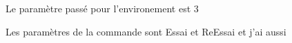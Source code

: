 \documentclass[a4paper,12pt]{book}
\begin{document}
\newenvironment{EssUn}[1]{
	\newcommand{\Commande}[2]{Les paramètres de la commande sont ##1 et ##2 et j'ai aussi \bloblo}
	Le paramètre passé pour l'environement est #1
}
{}

\begin{EssUn}{3}

\Commande{Essai}{ReEssai}

\end{EssUn}
\end{document}
